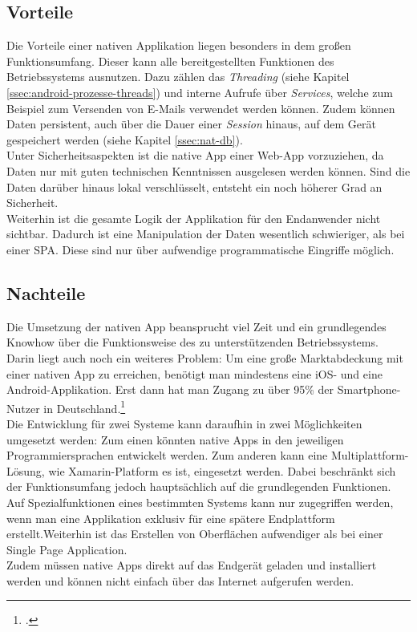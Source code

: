 \subsection{Vorteile}
\label{sec:vorteile-native-app}
Die Vorteile einer nativen Applikation liegen besonders in dem großen Funktionsumfang. Dieser kann alle bereitgestellten Funktionen des Betriebssystems ausnutzen. Dazu zählen das \textit{Threading} (siehe Kapitel \ref{ssec:android-prozesse-threads}) und interne Aufrufe über \textit{Services}, welche zum Beispiel zum Versenden von E-Mails verwendet werden können. Zudem können Daten persistent, auch über die Dauer einer \textit{Session} hinaus, auf dem Gerät gespeichert werden (siehe Kapitel \ref{ssec:nat-db}).\\
Unter Sicherheitsaspekten ist die native \gls{App} einer \ac{Web-App} vorzuziehen, da Daten nur mit guten technischen Kenntnissen ausgelesen werden können. Sind die Daten darüber hinaus lokal verschlüsselt, entsteht ein noch höherer Grad an Sicherheit.\\
Weiterhin ist die gesamte Logik der Applikation für den Endanwender nicht sichtbar. Dadurch ist eine Manipulation der Daten wesentlich schwieriger, als bei einer \ac{SPA}. Diese sind nur über aufwendige programmatische Eingriffe möglich.

\subsection{Nachteile}
\label{sec:nachteile-native-app}
Die Umsetzung der nativen \gls{App} beansprucht viel Zeit und ein grundlegendes Knowhow über die Funktionsweise des zu unterstützenden Betriebssystems.\\
Darin liegt auch noch ein weiteres Problem: Um eine große Marktabdeckung mit einer nativen \gls{App} zu erreichen, benötigt man mindestens eine \gls{iOS}- und eine \gls{Android}-Applikation. Erst dann hat man Zugang zu über 95\% der Smartphone-Nutzer in Deutschland.\footcite{Statista-SmartphoneVerteilung}\\
Die Entwicklung für zwei Systeme kann daraufhin in zwei Möglichkeiten umgesetzt werden: Zum einen könnten native Apps in den jeweiligen Programmiersprachen entwickelt werden. Zum anderen kann eine Multiplattform-Lösung, wie Xamarin-Platform es ist, eingesetzt werden. Dabei beschränkt sich der Funktionsumfang jedoch hauptsächlich auf die grundlegenden Funktionen. Auf Spezialfunktionen eines bestimmten Systems kann nur  zugegriffen werden, wenn man eine Applikation exklusiv für eine spätere Endplattform erstellt.Weiterhin ist das Erstellen von Oberflächen aufwendiger als bei einer Single Page Application.\\
Zudem müssen native \glspl{App} direkt auf das Endgerät geladen und installiert werden und können nicht einfach über das Internet aufgerufen werden. 

